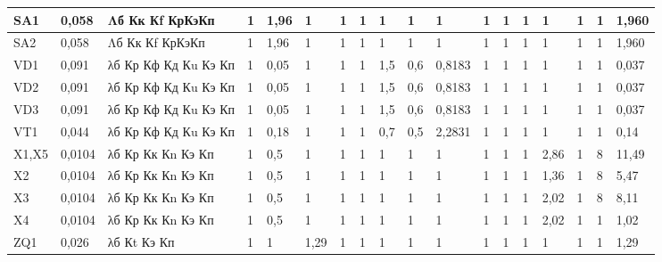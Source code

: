 \begin{sidewaystable}
\begin{tabular}{|l |l |l |l |l |l |l |l |l |l |l |l |l |l |l |l |l |l |}
SA1         & 0,058 & Λб Кк Кf КрКэКп & 1 & 1,96 & 1 & 1 & 1 & 1 & 1 & 1 & 1 & 1 & 1 & 1 & 1 & 1 & 1,960 \\ \hline
SA2         & 0,058 & Λб Кк Кf КрКэКп & 1 & 1,96 & 1 & 1 & 1 & 1 & 1 & 1 & 1 & 1 & 1 & 1 & 1 & 1 & 1,960 \\ \hline
VD1         & 0,091 & λб Кр Кф Кд Кu Кэ Кп    & 1 & 0,05 & 1 & 1 & 1 & 1,5 & 0,6 & 0,8183 & 1 & 1 & 1 & 1 & 1 & 1 & 0,037 \\ \hline
VD2         & 0,091 & λб Кр Кф Кд Кu Кэ Кп    & 1 & 0,05 & 1 & 1 & 1 & 1,5 & 0,6 & 0,8183 & 1 & 1 & 1 & 1 & 1 & 1 & 0,037 \\ \hline
VD3         & 0,091 & λб Кр Кф Кд Кu Кэ Кп    & 1 & 0,05 & 1 & 1 & 1 & 1,5 & 0,6 & 0,8183 & 1 & 1 & 1 & 1 & 1 & 1 & 0,037 \\ \hline
VT1         & 0,044 & λб Кр Кф Кд Кu Кэ Кп    & 1 & 0,18 & 1 & 1 & 1 & 0,7 & 0,5 & 2,2831 & 1 & 1 & 1 & 1 & 1 & 1 & 0,14 \\ \hline
X1,X5       & 0,0104 & λб Кр Кк Кn Кэ Кп  & 1 & 0,5 & 1 & 1 & 1 & 1 & 1 & 1 & 1 & 1 & 1 & 2,86 & 1 & 8 & 11,49 \\ \hline
X2          & 0,0104 & λб Кр Кк Кn Кэ Кп  & 1 & 0,5 & 1 & 1 & 1 & 1 & 1 & 1 & 1 & 1 & 1 & 1,36 & 1 & 8 & 5,47 \\ \hline
X3          & 0,0104 & λб Кр Кк Кn Кэ Кп  & 1 & 0,5 & 1 & 1 & 1 & 1 & 1 & 1 & 1 & 1 & 1 & 2,02 & 1 & 8 & 8,11 \\ \hline
X4          & 0,0104 & λб Кр Кк Кn Кэ Кп  & 1 & 0,5 & 1 & 1 & 1 & 1 & 1 & 1 & 1 & 1 & 1 & 2,02 & 1 & 1 & 1,02 \\ \hline
ZQ1         & 0,026 & λб Кt Кэ Кп         & 1 & 1 & 1,29 & 1 & 1 & 1 & 1 & 1 & 1 & 1 & 1 & 1 & 1 & 1 & 1,29 \\ \hline
    
  \end{tabular}
\end{sidewaystable}



\newpage

